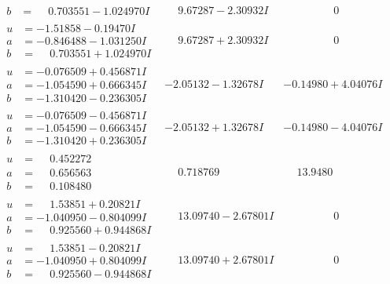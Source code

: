 \documentclass[1p]{elsarticle_modified}
\theoremstyle{definition}
\begin{document}
$$\begin{array}{c|c|c}
\begin{aligned}
b &= \phantom{-}0.703551 - 1.024970 I\end{aligned}
 & \phantom{-}9.67287 - 2.30932 I & \phantom{-0.000000 } 0 \\ \hline\begin{aligned}
u &= -1.51858 - 0.19470 I \\
a &= -0.846488 - 1.031250 I \\
b &= \phantom{-}0.703551 + 1.024970 I\end{aligned}
 & \phantom{-}9.67287 + 2.30932 I & \phantom{-0.000000 } 0 \\ \hline\begin{aligned}
u &= -0.076509 + 0.456871 I \\
a &= -1.054590 + 0.666345 I \\
b &= -1.310420 - 0.236305 I\end{aligned}
 & -2.05132 - 1.32678 I & -0.14980 + 4.04076 I \\ \hline\begin{aligned}
u &= -0.076509 - 0.456871 I \\
a &= -1.054590 - 0.666345 I \\
b &= -1.310420 + 0.236305 I\end{aligned}
 & -2.05132 + 1.32678 I & -0.14980 - 4.04076 I \\ \hline\begin{aligned}
u &= \phantom{-}0.452272\phantom{ +0.000000I} \\
a &= \phantom{-}0.656563\phantom{ +0.000000I} \\
b &= \phantom{-}0.108480\phantom{ +0.000000I}\end{aligned}
 & \phantom{-}0.718769\phantom{ +0.000000I} & \phantom{-}13.9480\phantom{ +0.000000I} \\ \hline\begin{aligned}
u &= \phantom{-}1.53851 + 0.20821 I \\
a &= -1.040950 - 0.804099 I \\
b &= \phantom{-}0.925560 + 0.944868 I\end{aligned}
 & \phantom{-}13.09740 - 2.67801 I & \phantom{-0.000000 } 0 \\ \hline\begin{aligned}
u &= \phantom{-}1.53851 - 0.20821 I \\
a &= -1.040950 + 0.804099 I \\
b &= \phantom{-}0.925560 - 0.944868 I\end{aligned}
 & \phantom{-}13.09740 + 2.67801 I & \phantom{-0.000000 } 0 \\ \hline\begin{aligned}

\end{aligned}
\end{array}$$
\end{document}
